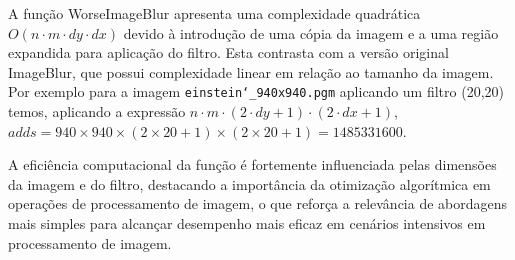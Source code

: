\documentclass{report}
\begin{document}
A função WorseImageBlur apresenta uma complexidade quadrática \(O(n \cdot m \cdot dy \cdot dx )\) devido à introdução de uma cópia da imagem e a uma região expandida para aplicação do filtro. Esta contrasta com a versão original ImageBlur, que possui complexidade linear em relação ao tamanho da imagem. Por exemplo para a imagem \texttt{einstein\char`_940x940.pgm} aplicando um filtro (20,20) temos, aplicando a expressão \(n \cdot m \cdot (2 \cdot dy + 1) \cdot (2 \cdot dx + 1)\), \texttt{$adds = 940\times940\times(2\times20+1)\times(2\times20+1) = 1485331600$}.
\par A eficiência computacional da função é fortemente influenciada pelas dimensões da imagem e do filtro, destacando a importância da otimização algorítmica em operações de processamento de imagem, o que reforça a relevância de abordagens mais simples para alcançar desempenho mais eficaz em cenários intensivos em processamento de imagem.
\end{document}
